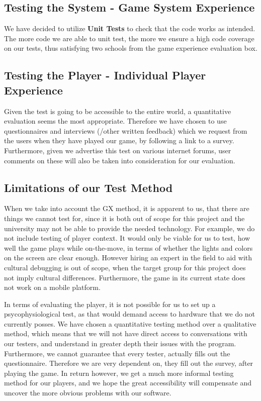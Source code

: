 \subsection{Testing the System - Game System Experience}

We have decided to utilize \textbf{Unit Tests} to check that the code works as intended.
The more code we are able to unit test, the more we ensure a high code coverage on our tests, thus satisfying two schools from the game
experience evaluation box.

\subsection{Testing the Player - Individual Player Experience}

Given the test is going to be accessible to the entire world, a quantitative evaluation seems the most appropriate. Therefore we have chosen to use questionnaires and interviews (/other written feedback) which we request from the users when they have played our game, by following a link to a survey. Furthermore, given we advertise this test on various internet forums, user comments on these will also be taken into consideration for our evaluation.

\subsection{Limitations of our Test Method}

When we take into account the GX method, it is apparent to us, that there are things we cannot test for, since it is both out of scope for this project and the university may not be able to provide the needed technology.
For example, we do not include testing of player context.
It would only be viable for us to test, how well the game plays while on-the-move, in terms of whether the lights and colors on the screen are clear enough.
However hiring an expert in the field to aid with cultural debugging is out of scope, when the target group for this project does not imply cultural differences.
Furthermore, the game in its current state does not work on a mobile platform.

In terms of evaluating the player, it is not possible for us to set up a psycophysiological test, as that would demand access to hardware that we do not currently posses. We have chosen a quantitative testing method over a qualitative method, which means that we will not have direct access to conversations with our testers, and understand in greater depth their issues with the program. Furthermore, we cannot guarantee that every tester, actually fills out the questionnaire. Therefore we are very dependent on, they fill out the survey, after playing the game. In return however, we get a much more informal testing method for our players, and we hope the great accessibility will compensate and uncover the more obvious problems with our software.

